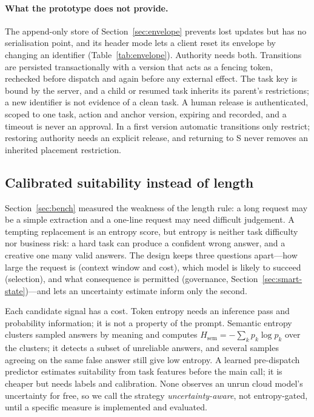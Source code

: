 \documentclass[11pt]{article}
\newcommand{\ubreak}{\textunderscore\allowbreak}
\newcommand{\code}[1]{{\ttfamily\let\_\ubreak #1}}
\begin{document}
\paragraph{What the prototype does not provide.} The append-only store of
Section~\ref{sec:envelope} prevents lost updates but has no serialisation point, and its
\code{header} mode lets a client reset its envelope by changing an identifier
(Table~\ref{tab:envelope}). Authority needs both. Transitions are persisted transactionally with
a version that acts as a fencing token, rechecked before dispatch and again before any external
effect. The task key is bound by the server, and a child or resumed task inherits its parent's
restrictions; a new identifier is not evidence of a clean task. A human release is
authenticated, scoped to one task, action and anchor version, expiring and recorded, and a
timeout is never an approval. In a first version automatic transitions only restrict; restoring
authority needs an explicit release, and returning to S never removes an inherited placement
restriction.

\subsection{Calibrated suitability instead of length}
\label{sec:smart-route}

Section~\ref{sec:bench} measured the weakness of the length rule: a long request may be a simple
extraction and a one-line request may need difficult judgement. A tempting replacement is an
entropy score, but entropy is neither task difficulty nor business risk: a hard task can produce
a confident wrong answer, and a creative one many valid answers. The design keeps three
questions apart---how large the request is (context window and cost), which model is likely to
succeed (selection), and what consequence is permitted (governance, Section~\ref{sec:smart-state})---and
lets an uncertainty estimate inform only the second.

Each candidate signal has a cost. Token entropy needs an inference pass and probability
information; it is not a property of the prompt. Semantic entropy~\cite{semanticentropy}
clusters sampled answers by meaning and computes
$H_{\mathrm{sem}} = -\sum_k p_k \log p_k$ over the clusters; it detects a subset of unreliable
answers, and several samples agreeing on the same false answer still give low entropy. A learned
pre-dispatch predictor estimates suitability from task features before the main call; it is
cheaper but needs labels and calibration. None observes an unrun cloud model's uncertainty for
free, so we call the strategy \emph{uncertainty-aware}, not entropy-gated, until a specific
measure is implemented and evaluated.
\end{document}
